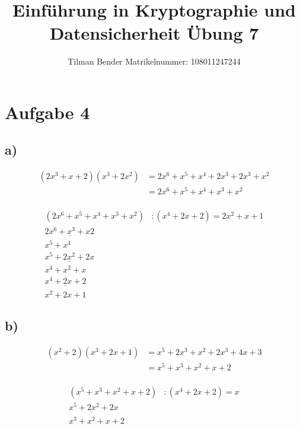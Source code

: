 \documentclass[10pt,a4paper]{article}
\author{Tilman Bender   Matrikelnummer: 108011247244\\}
\title{Einführung in Kryptographie und Datensicherheit Übung 7}
\begin{document}
\maketitle

\section*{Aufgabe 4}
\subsection*{a)}
\begin{align*}
(2x^{3}+x+2)(x^{3}+2x^{2})&=2x^{6}+x^{5}+x^{4}+2x^{3}+2x^{3}+x^{2}\\
					 &=2x^{6}+x^{5}+x^{4}+x^{3}+x^{2}\\
\end{align*}

\begin{align*}
(2x^{6}+x^{5}+x^{4}+x^{3}+x^{2})&:(x^{4}+2x+2)=2x^{2}+x+1\\
\underline{2x^{6}+x^{3}+x{2}}&\\
x^{5}+x^{4}&\\
\underline{x^{5}+2x^{2}+2x}&\\
x^{4}+x^2+x&\\
\underline{x^{4}+2x+2}&\\
x^{2}+2x+1
\end{align*}

\subsection*{b)}
\begin{align*}
(x^{2}+2)(x^{3}+2x+1)&=x^{5}+2x^{3}+x^{2}+2x^{3}+4x+3\\
				&=x^{5}+x^{3}+x^{2}+x+2\\
\end{align*}

\begin{align*}
(x^{5}+x^{3}+x^{2}+x+2)&:(x^{4}+2x+2)=x\\
\underline{x^{5}+2x^{2}+2}x&\\
x^{3}+x^{2}+x+2
\end{align*}				
\end{document}
